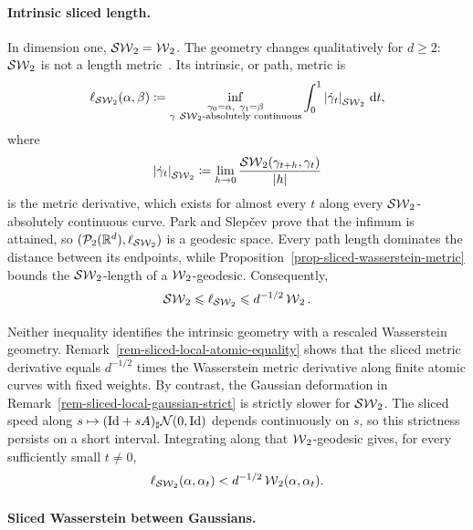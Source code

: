 \paragraph{Intrinsic sliced length.}\label{par-sliced-intrinsic-length}
In dimension one, $\operatorname{\mathcal{SW}}_2=\operatorname{\mathcal{W}}_2$. The geometry changes qualitatively for
$d\geq2$: $\operatorname{\mathcal{SW}}_2$ is not a length metric~\cite{ParkSlepcev2023SlicedGeometry}.
Its intrinsic, or path, metric is
\begin{equation}\label{eq-intrinsic-sliced-length}
	\ell_{\operatorname{\mathcal{SW}}_2}(\alpha,\beta)
	\coloneqq
	\inf_{\substack{\gamma_0=\alpha,\ \gamma_1=\beta\\
		\gamma\ \text{$\operatorname{\mathcal{SW}}_2$-absolutely continuous}}}
	\int_0^1 \left\lvert\dot\gamma_t\right\rvert_{\operatorname{\mathcal{SW}}_2}\,\mathrm{d} t,
\end{equation}
where
\[
	\left\lvert\dot\gamma_t\right\rvert_{\operatorname{\mathcal{SW}}_2}
	\coloneqq
	\lim_{h\to0}\frac{\operatorname{\mathcal{SW}}_2(\gamma_{t+h},\gamma_t)}{\left\lvert h\right\rvert}
\]
is the metric derivative, which exists for almost every $t$ along every
$\operatorname{\mathcal{SW}}_2$-absolutely continuous curve. Park and Slep\v{c}ev prove that the infimum is attained, so
$(\mathcal{P}_2(\mathbb{R}^d),\ell_{\operatorname{\mathcal{SW}}_2})$ is a geodesic space. Every path length dominates
the distance between its endpoints, while
Proposition~\ref{prop-sliced-wasserstein-metric} bounds the $\operatorname{\mathcal{SW}}_2$-length of a
$\operatorname{\mathcal{W}}_2$-geodesic. Consequently,
\[
	\operatorname{\mathcal{SW}}_2\leqslant\ell_{\operatorname{\mathcal{SW}}_2}\leqslant d^{-1/2}\operatorname{\mathcal{W}}_2.
\]

Neither inequality identifies the intrinsic geometry with a rescaled
Wasserstein geometry. Remark~\ref{rem-sliced-local-atomic-equality} shows that
the sliced metric derivative equals $d^{-1/2}$ times the Wasserstein metric
derivative along finite atomic curves with fixed weights. By contrast, the
Gaussian deformation in Remark~\ref{rem-sliced-local-gaussian-strict} is
strictly slower for $\operatorname{\mathcal{SW}}_2$. The sliced speed along
$s\mapsto(\mathrm{Id}+sA)_\sharp\mathcal{N}(0,\mathrm{Id})$ depends continuously on $s$, so this
strictness persists on a short interval. Integrating along that
$\operatorname{\mathcal{W}}_2$-geodesic gives, for every sufficiently small $t\neq0$,
\[
	\ell_{\operatorname{\mathcal{SW}}_2}(\alpha,\alpha_t)
	<d^{-1/2}\operatorname{\mathcal{W}}_2(\alpha,\alpha_t).
\]

\paragraph{Sliced Wasserstein between Gaussians.}

